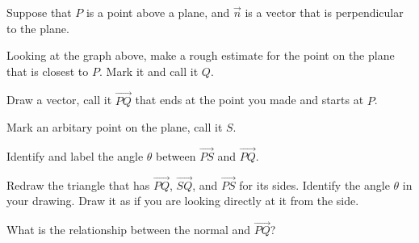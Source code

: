 \begin{problem}
\item Suppose that $P$ is a point above a plane, and $\vec{n}$ is a vector that is perpendicular to the plane.


  \begin{subproblem}
    \item Looking at the graph above, make a rough estimate for the point on the plane that is closest to $P$. Mark it and call it $Q$.
    \item Draw a vector, call it $\overrightarrow{PQ}$ that ends at the point you made and starts at $P$.
    \item Mark an arbitary point on the plane, call it $S$.
    \item Identify and label the angle $\theta$ between $\overrightarrow{PS}$ and $\overrightarrow{PQ}$.
      \clearpage

    \item Redraw the triangle that has $\overrightarrow{PQ}$, $\overrightarrow{SQ}$, and $\overrightarrow{PS}$ for its sides.
       Identify the angle $\theta$ in your drawing. Draw it as if you are looking directly at it from the side.
      \vfill

    \item What is the relationship between the normal and $\overrightarrow{PQ}$?
      \vspace{3em}


\end{subproblem}
\end{problem}
